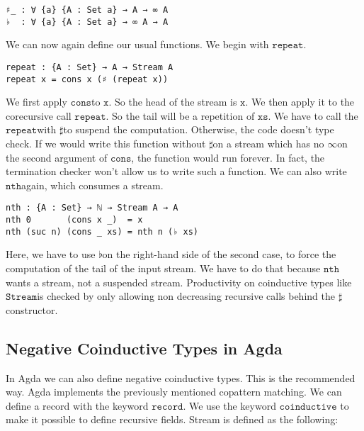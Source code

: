 \documentclass[a4paper,cleardoubleempty,BCOR1cm]{scrbook}
\begin{document}
\begin{verbatim}
♯_ : ∀ {a} {A : Set a} → A → ∞ A
♭  : ∀ {a} {A : Set a} → ∞ A → A
\end{verbatim}

We can now again define our usual functions.  We begin with $\mathtt{repeat}$.

\begin{verbatim}
repeat : {A : Set} → A → Stream A
repeat x = cons x (♯ (repeat x))
\end{verbatim}

We first apply $\mathtt{cons}$\;to $\mathtt{x}$. So the head of the stream is $\mathtt{x}$. We then apply
it to the corecursive call $\mathtt{repeat}$. So the tail will be a repetition of
$\mathtt{xs}$. We have to call the $\mathtt{repeat}$\;with $\mathtt{\sharp}$\;to suspend the computation.
Otherwise, the code doesn't type check. If we would write this function
without $\mathtt{\sharp}$\;on a stream which has no $\mathtt{\infty}$\;on the second argument of
$\mathtt{cons}$, the function would run forever. In fact, the termination checker won't
allow us to write such a function. We can also write $\mathtt{nth}$\;again, which
consumes a stream.

\begin{verbatim}
nth : {A : Set} → ℕ → Stream A → A
nth 0       (cons x _)  = x
nth (suc n) (cons _ xs) = nth n (♭ xs)
\end{verbatim}

Here, we have to use $\mathtt{\flat}$\;on the right-hand side of the second case, to
force the computation of the tail of the input stream.  We have to do that
because $\mathtt{nth}$\;wants a stream, not a suspended stream.
Productivity on coinductive types like $\mathtt{Stream}$\;is checked by only allowing non
decreasing recursive calls behind the $\mathtt{\sharp}$\;constructor.

\subsection{Negative Coinductive Types in Agda}
\label{sec:orgc6ff4cd}
In Agda we can also define negative coinductive types.  This is the
recommended way.  Agda implements the previously mentioned copattern matching.
We can define a record with the keyword $\mathtt{record}$.  We use the keyword $\mathtt{coinductive}$
to make it possible to define recursive fields.  Stream is defined as the
following:
\end{document}
